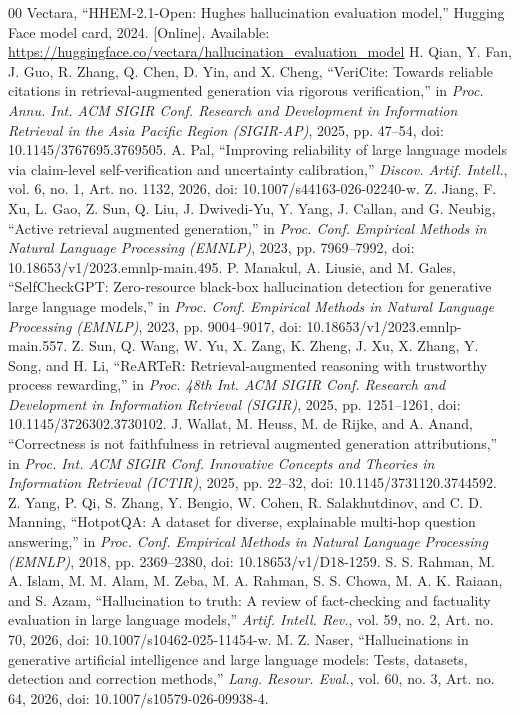 \documentclass[conference]{IEEEtran}
\begin{document}
\begin{thebibliography}{00}
 Vectara, ``HHEM-2.1-Open: Hughes hallucination evaluation model,'' Hugging Face model card, 2024. [Online]. Available: \url{https://huggingface.co/vectara/hallucination_evaluation_model}
 H. Qian, Y. Fan, J. Guo, R. Zhang, Q. Chen, D. Yin, and X. Cheng, ``VeriCite: Towards reliable citations in retrieval-augmented generation via rigorous verification,'' in \textit{Proc. Annu. Int. ACM SIGIR Conf. Research and Development in Information Retrieval in the Asia Pacific Region (SIGIR-AP)}, 2025, pp. 47--54, doi: 10.1145/3767695.3769505.
 A. Pal, ``Improving reliability of large language models via claim-level self-verification and uncertainty calibration,'' \textit{Discov. Artif. Intell.}, vol. 6, no. 1, Art. no. 1132, 2026, doi: 10.1007/s44163-026-02240-w.
 Z. Jiang, F. Xu, L. Gao, Z. Sun, Q. Liu, J. Dwivedi-Yu, Y. Yang, J. Callan, and G. Neubig, ``Active retrieval augmented generation,'' in \textit{Proc. Conf. Empirical Methods in Natural Language Processing (EMNLP)}, 2023, pp. 7969--7992, doi: 10.18653/v1/2023.emnlp-main.495.
 P. Manakul, A. Liusie, and M. Gales, ``SelfCheckGPT: Zero-resource black-box hallucination detection for generative large language models,'' in \textit{Proc. Conf. Empirical Methods in Natural Language Processing (EMNLP)}, 2023, pp. 9004--9017, doi: 10.18653/v1/2023.emnlp-main.557.
 Z. Sun, Q. Wang, W. Yu, X. Zang, K. Zheng, J. Xu, X. Zhang, Y. Song, and H. Li, ``ReARTeR: Retrieval-augmented reasoning with trustworthy process rewarding,'' in \textit{Proc. 48th Int. ACM SIGIR Conf. Research and Development in Information Retrieval (SIGIR)}, 2025, pp. 1251--1261, doi: 10.1145/3726302.3730102.
 J. Wallat, M. Heuss, M. de Rijke, and A. Anand, ``Correctness is not faithfulness in retrieval augmented generation attributions,'' in \textit{Proc. Int. ACM SIGIR Conf. Innovative Concepts and Theories in Information Retrieval (ICTIR)}, 2025, pp. 22--32, doi: 10.1145/3731120.3744592.
 Z. Yang, P. Qi, S. Zhang, Y. Bengio, W. Cohen, R. Salakhutdinov, and C. D. Manning, ``HotpotQA: A dataset for diverse, explainable multi-hop question answering,'' in \textit{Proc. Conf. Empirical Methods in Natural Language Processing (EMNLP)}, 2018, pp. 2369--2380, doi: 10.18653/v1/D18-1259.
 S. S. Rahman, M. A. Islam, M. M. Alam, M. Zeba, M. A. Rahman, S. S. Chowa, M. A. K. Raiaan, and S. Azam, ``Hallucination to truth: A review of fact-checking and factuality evaluation in large language models,'' \textit{Artif. Intell. Rev.}, vol. 59, no. 2, Art. no. 70, 2026, doi: 10.1007/s10462-025-11454-w.
 M. Z. Naser, ``Hallucinations in generative artificial intelligence and large language models: Tests, datasets, detection and correction methods,'' \textit{Lang. Resour. Eval.}, vol. 60, no. 3, Art. no. 64, 2026, doi: 10.1007/s10579-026-09938-4.
\end{thebibliography}
\end{document}
